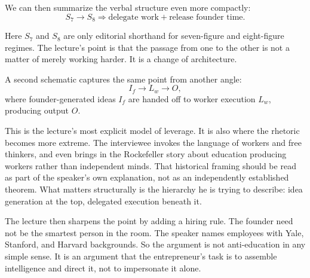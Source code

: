 We can then summarize the verbal structure even more compactly:
\begin{equation}
S_7 \to S_8 \Rightarrow \text{delegate work} + \text{release founder time}.
\end{equation}

Here \(S_7\) and \(S_8\) are only editorial shorthand for seven-figure and eight-figure regimes. The lecture's point is that the passage from one to the other is not a matter of merely working harder. It is a change of architecture.

A second schematic captures the same point from another angle:
\begin{equation}
I_f \to L_w \to O,
\end{equation}
where founder-generated ideas \(I_f\) are handed off to worker execution \(L_w\), producing output \(O\).

\begin{figure}[h]
\centering
{}
\end{figure}

This is the lecture's most explicit model of leverage. It is also where the rhetoric becomes more extreme. The interviewee invokes the language of workers and free thinkers, and even brings in the Rockefeller story about education producing workers rather than independent minds. That historical framing should be read as part of the speaker's own explanation, not as an independently established theorem. What matters structurally is the hierarchy he is trying to describe: idea generation at the top, delegated execution beneath it.

The lecture then sharpens the point by adding a hiring rule. The founder need not be the smartest person in the room. The speaker names employees with Yale, Stanford, and Harvard backgrounds. So the argument is not anti-education in any simple sense. It is an argument that the entrepreneur's task is to assemble intelligence and direct it, not to impersonate it alone.

